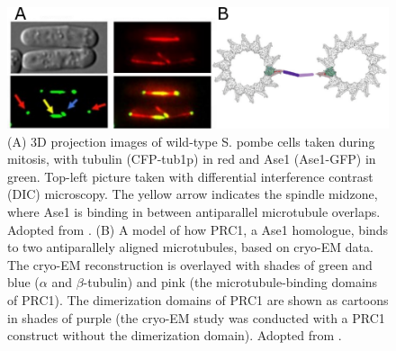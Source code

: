 \begin{figure}[h!tb]
\centering
\includegraphics[scale=1.1]{Figures/Ase1.png}
\caption[Introduction to Ase1.]{
(A) 3D projection images of wild-type S. pombe cells taken during mitosis, with tubulin (CFP-tub1p) in red and Ase1 (Ase1-GFP) in green. Top-left picture taken with differential interference contrast (DIC) microscopy. The yellow arrow indicates the spindle midzone, where Ase1 is binding in between antiparallel microtubule overlaps. Adopted from \cite{Loiodice2005}. (B) A model of how PRC1, a Ase1 homologue, binds to two antiparallely aligned microtubules, based on cryo-EM data. The cryo-EM reconstruction is overlayed with shades of green and blue ($\alpha$ and $\beta$-tubulin) and pink (the microtubule-binding domains of PRC1). The dimerization domains of PRC1 are shown as cartoons in shades of purple (the cryo-EM study was conducted with a PRC1 construct without the dimerization domain). Adopted from \cite{Kellogg2016}. 
	}\label{Ase1}
\end{figure}

